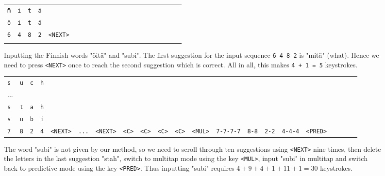 \documentclass{llncs}
\begin{document}
\begin{figure}[htb!]
\begin{center}
\begin{tabular}{lllllllllllllllllllll}
\texttt{\"{m}} & \texttt{i} & \texttt{t} & \texttt{\"{a}} & \\ 
\texttt{\"{o}} & \texttt{i} & \texttt{t} & \texttt{\"{a}} & \\ 
\texttt{6} & \texttt{4} & \texttt{8} & \texttt{2} & \texttt{<NEXT>}\\\\
\end{tabular}
\end{center}
\caption{Inputting the Finnish words "\"{o}it\"{a}" and "subi". The first suggestion for the input sequence \texttt{6-4-8-2} is "mit\"{a}" (what). Hence we need to press \texttt{<NEXT>} once to reach the second suggestion which is correct. All in all, this makes \texttt{4 + 1 = 5} keystrokes.} \label{new-method-kpc-known}
\end{figure}

\begin{figure}[htb!]
\begin{center}
\begin{tabular}{lllllllllllllllllllll}
\texttt{s} & \texttt{u} & \texttt{c} & \texttt{h}\\
...\\
\texttt{s} & \texttt{t} & \texttt{a} & \texttt{h}\\
\texttt{s} & \texttt{u} & \texttt{b} & \texttt{i}\\    
\texttt{7} & \texttt{8} & \texttt{2} & \texttt{4} & \texttt{<NEXT>} & \texttt{...} & \texttt{<NEXT>} & \texttt{<C>} & \texttt{<C>} & \texttt{<C>} & \texttt{<C>} & \texttt{<MUL>} & \texttt{7-7-7-7} & \texttt{8-8} & \texttt{2-2} & \texttt{4-4-4} & \texttt{<PRED>}
\end{tabular}

\caption{The word "subi" is not given by our method, so we need to scroll through ten suggestions using \texttt{<NEXT>} nine times, then delete the letters in the last suggestion "stah", switch to multitap mode using the key \texttt{<MUL>}, input "subi" in multitap and switch back to predictive mode using the key \texttt{<PRED>}. Thus inputting "subi" requires $4 + 9 + 4 + 1 + 11 + 1 = 30$ keystrokes.} \label{new-method-kpc-unknown}
\end{center}
\end{figure}
\end{document}
